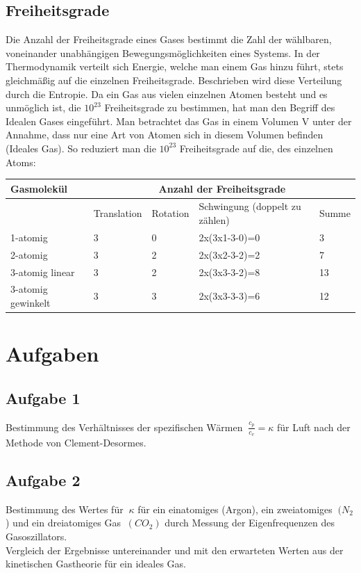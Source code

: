 \documentclass{article}
\begin{document}
{{\subsection{Freiheitsgrade}
Die Anzahl der Freiheitsgrade eines Gases bestimmt die Zahl der wählbaren, voneinander unabhängigen Bewegungsmöglichkeiten eines Systems. In der Thermodynamik verteilt sich Energie, welche man einem Gas hinzu führt, stets gleichmäßig auf die einzelnen Freiheitsgrade. Beschrieben wird diese Verteilung durch die Entropie. Da ein Gas aus vielen einzelnen Atomen besteht und es unmöglich ist, die \(10^{23}\) Freiheitsgrade zu bestimmen, hat man den Begriff des Idealen Gases eingeführt. Man betrachtet das Gas in einem Volumen V unter der Annahme, dass nur eine Art von Atomen sich in diesem Volumen befinden (Ideales Gas). So reduziert man die \(10^{23}\) Freiheitsgrade auf die, des einzelnen Atoms:

\vspace{1cm}
\begin{tabular}{l|l|l|l|l}
Gasmolekül & \multicolumn{4}{c}{Anzahl der Freiheitsgrade}\\
\hline
& Translation & Rotation & Schwingung (doppelt zu zählen) & Summe\\
\hline
1-atomig & 3 & 0 & 2x(3x1-3-0)=0 & 3\\
2-atomig & 3 & 2 & 2x(3x2-3-2)=2 & 7\\
3-atomig linear & 3 & 2 & 2x(3x3-3-2)=8 & 13\\
3-atomig gewinkelt & 3 & 3 & 2x(3x3-3-3)=6 & 12\\ 
\end{tabular}

\vspace{2cm}
\section{Aufgaben}
\subsection{Aufgabe 1}
Bestimmung des Verhältnisses der spezifischen Wärmen \(\ \frac{c_{p}}{c_{v}}=\kappa \) für Luft nach der Methode von {\sc Clement-Desormes}.
\subsection{Aufgabe 2}
Bestimmung des Wertes für \(\ \kappa \)  für ein einatomiges (Argon), ein zweiatomiges \(\ (N_{2}\)) und ein dreiatomiges Gas \(\ (CO_{2})\) durch Messung der Eigenfrequenzen des Gasoszillators.\\
Vergleich der Ergebnisse untereinander und mit den erwarteten Werten aus der kinetischen Gastheorie für ein ideales Gas.

}}
\end{document}
